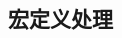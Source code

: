 \documentclass[class=book, crop=false]{standalone}
\begin{document}
\begin{CJK}{UTF8}{gbsn}

\chapter{宏定义处理}



\cleardoublepage

\end{CJK}
\end{document}
